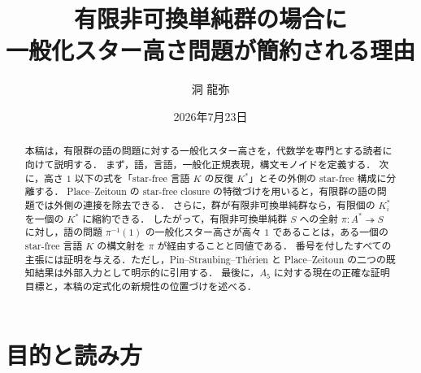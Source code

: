 
\renewcommand{\proofname}{証明}
\renewcommand{\abstractname}{概要}

\newcommand{\Synt}{\operatorname{Synt}}
\newcommand{\SFcl}{\operatorname{SF}}
\newcommand{\im}{\operatorname{im}}
\newcommand{\id}{\operatorname{id}}
\newcommand{\gsh}{\operatorname{gsh}}

\title{有限非可換単純群の場合に\\
一般化スター高さ問題が簡約される理由}
\author{洞 龍弥}
\address{ZEN大学 知能情報社会学部}
\date{2026年7月23日}



\begin{abstract}
本稿は，有限群の語の問題に対する一般化スター高さを，代数学を専門とする読者に向けて説明する．
まず，語，言語，一般化正規表現，構文モノイドを定義する．
次に，高さ $1$ 以下の式を「star-free 言語 $K$ の反復 $K^*$」とその外側の star-free 構成に分離する．
Place--Zeitoun の star-free closure の特徴づけを用いると，有限群の語の問題では外側の連接を除去できる．
さらに，群が有限非可換単純群なら，有限個の $K_i^*$ を一個の $K^*$ に縮約できる．
したがって，有限非可換単純群 $S$ への全射 $\pi:A^*\twoheadrightarrow S$ に対し，語の問題 $\pi^{-1}(1)$ の一般化スター高さが高々 $1$ であることは，ある一個の star-free 言語 $K$ の構文射を $\pi$ が経由することと同値である．
番号を付したすべての主張には証明を与える．ただし，Pin--Straubing--Th\'erien と Place--Zeitoun の二つの既知結果は外部入力として明示的に引用する．
最後に，$A_5$ に対する現在の正確な証明目標と，本稿の定式化の新規性の位置づけを述べる．
\end{abstract}

\maketitle
\tableofcontents

\section{目的と読み方}

